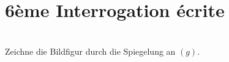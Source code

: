 


\pagestyle{empty}
\section*{6ème Interrogation écrite}

\\
Zeichne die Bildfigur durch die Spiegelung an $(g)$.\\
[Contenu symétrie...]
